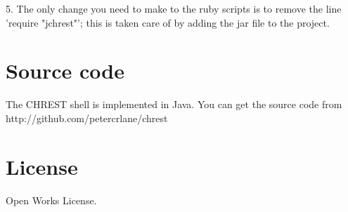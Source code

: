 \documentclass{article}
\begin{document}
5. The only change you need to make to the ruby scripts is to remove the line 'require "jchrest"'; this is taken care of by adding the jar file to the project.

\section{Source code}

The CHREST shell is implemented in Java.  
You can get the source code from http://github.com/petercrlane/chrest

\section{License}

Open Works License.
\end{document}
